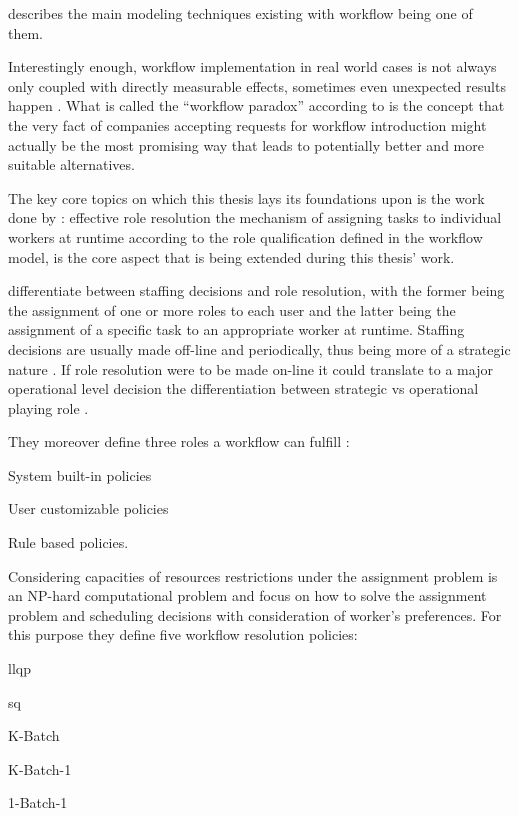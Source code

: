 \citet{Aguilar-Saven2004} describes the main modeling techniques existing with workflow being one of them.

Interestingly enough, workflow implementation in real world cases is not always only coupled with directly measurable effects, sometimes even unexpected results happen \citep{Reijers2005}. What is called the ``workflow paradox'' according to \citet{Reijers2005} is the concept that the very fact of companies accepting requests for workflow introduction might actually be the most promising way that leads to potentially better and more suitable alternatives.

The key core topics on which this thesis lays its foundations upon is the work done by \citet{Zeng2005}: effective role resolution \ie the mechanism of assigning tasks to individual workers at runtime according to the role qualification defined in the workflow model, is the core aspect that is being extended during this thesis' work.

\citet{Zeng2005} differentiate between staffing decisions and role resolution, with the former being the assignment of one or more roles to each user and the latter being the assignment of a specific task to an appropriate worker at runtime. Staffing decisions are usually made off-line and periodically, thus being more of a strategic nature \citep{Zeng2005}. If role resolution were to be made on-line it could translate to a major operational level decision \ie the differentiation between strategic vs operational playing role \citep{Zeng2005}.

They moreover define three roles a workflow can fulfill \citep{Zeng2005}:
\begin{enumerate*}
	\item System built-in policies
	\item User customizable policies
	\item Rule based policies.
\end{enumerate*}

Considering capacities of resources restrictions under the assignment problem is an NP-hard computational problem and \citet{Zeng2005} focus on how to solve the assignment problem and scheduling decisions with consideration of worker's preferences. For this purpose they define five workflow resolution policies:
\begin{enumerate*}
	\item \gls{llqp}
	\item \gls{sq}
	\item K-Batch
	\item K-Batch-1
	\item 1-Batch-1
\end{enumerate*}

